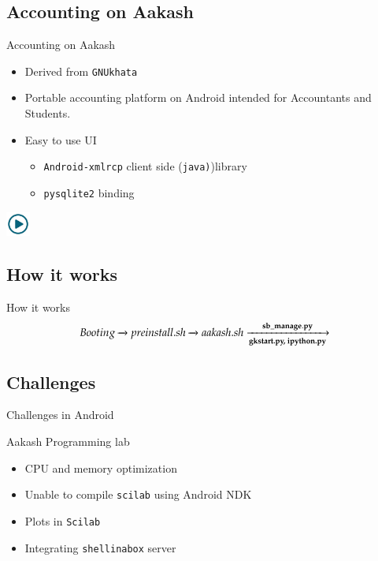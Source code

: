 \documentclass{beamer}
\begin{document}
  \subsection{Accounting on Aakash}
  \begin{frame}{Accounting on Aakash}
    \begin{itemize}
      \item Derived from {\tt GNUkhata}
      \item Portable accounting platform on Android intended for
        Accountants and Students.
      \item Easy to use UI
        \pause
        \begin{itemize}
          \item {\tt Android-xmlrcp} client side ({\tt java)})library
          \item {\tt pysqlite2} binding
        \end{itemize}
    \end{itemize}
      \centerline{\href{file:///home/sachin/Videos/fossin/final.AVI}{\includegraphics[height=0.8cm,width=0.8cm]{play.jpg}}}
  \end{frame}

  \subsection{How it works}
  \begin{frame}{How it works}
    \begin{equation*}
      Booting \xrightarrow[\text{}]{} 
      preinstall.sh \xrightarrow[\text{}]{}
      aakash.sh\xrightarrow[\text{\bf{gkstart.py, ipython.py}}]{\bf{sb\_manage.py}}
    \end{equation*}
  \end{frame}

  \subsection{Challenges}
  \begin{frame}{Challenges in Android}
    \begin{block}{Aakash Programming lab}
      \begin{itemize}
        \item CPU and memory optimization
        \item Unable to compile {\tt scilab} using Android NDK
        \item Plots in {\tt Scilab}
        \item Integrating {\tt shellinabox} server
      \end{itemize}
    \end{block}
    \end{frame}
\end{document}
